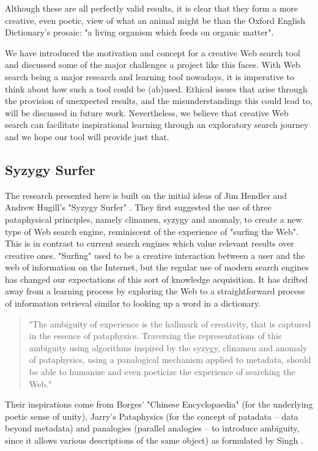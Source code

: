 Although these are all perfectly valid results, it is clear that they form a more creative, even poetic, view of what an animal might be than the Oxford English Dictionary's prosaic: "a living organism which feeds on organic matter".

We have introduced the motivation and concept for a creative Web search tool and discussed some of the major challenges a project like this faces. With Web search being a major research and learning tool nowadays, it is imperative to think about how such a tool could be (ab)used. Ethical issues that arise through the provision of unexpected results, and the misunderstandings this could lead to, will be discussed in future work. Nevertheless, we believe that creative Web search can facilitate inspirational learning through an exploratory search journey and we hope our tool will provide just that.

\subsection{Syzygy Surfer}

The research presented here is built on the initial ideas of Jim Hendler and Andrew Hugill's "Syzygy Surfer" \citep{Hendler2011, Hendler2013}. They first suggested the use of three pataphysical principles, namely clinamen, syzygy and anomaly, to create a new type of Web search engine, reminiscent of the experience of "surfing the Web". This is in contrast to current search engines which value relevant results over creative ones. "Surfing" used to be a creative interaction between a user and the web of information on the Internet, but the regular use of modern search engines has changed our expectations of this sort of knowledge acquisition. It has drifted away from a learning process by exploring the Web to a straightforward process of information retrieval similar to looking up a word in a dictionary.

\begin{quote}
  "The ambiguity of experience is the hallmark of creativity, that is captured in the essence of pataphysics. Traversing the representations of this ambiguity using algorithms inspired by the syzygy, clinamen and anomaly of pataphysics, using a panalogical mechanism applied to metadata, should be able to humanize and even poeticize the experience of searching the Web." \citep{Hendler2013}
\end{quote}

Their inspirations come from Borges' "Chinese Encyclopaedia" \citep{Borges2000} (for the underlying poetic sense of unity), Jarry's Pataphysics \citep{Jarry1996} (for the concept of patadata – data beyond metadata) and  panalogies (parallel analogies – to introduce ambiguity, since it allows various descriptions of the same object) as formulated by Singh \citep{Singh2005}.

